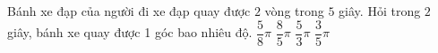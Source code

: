 
\begin{ex}%
	Bánh xe đạp của người đi xe đạp quay được $2$ vòng  trong $5$ giây. Hỏi trong $2$ giây, bánh xe quay được 1 góc bao nhiêu độ.
	 \choice
		 {$\dfrac{5}{8}\pi$}
		{\True $\dfrac{8}{5}\pi$} 
		 {$\dfrac{5}{3}\pi$}
		 {$\dfrac{3}{5}\pi$}
\end{ex}
